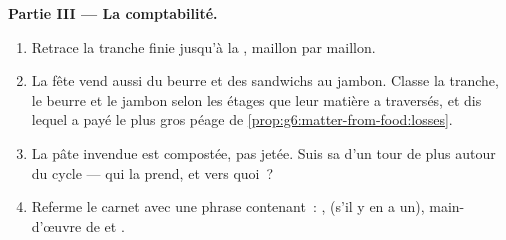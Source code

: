 \begin{problem}
\medskip\noindent\textbf{Partie III --- La comptabilité.}
\begin{enumerate}[resume]
  \item Retrace la tranche finie jusqu'à la , maillon par
        maillon.
  \item La fête vend aussi du beurre et des sandwichs au jambon.
        Classe la tranche, le beurre et le jambon selon les étages
        que leur matière a traversés, et dis lequel a payé le plus
        gros péage de
        \cref{prop:g6:matter-from-food:losses}.
  \item La pâte invendue est compostée, pas jetée. Suis sa  d'un tour de plus autour du cycle --- qui la
        prend, et vers quoi~?
  \item Referme le carnet avec une phrase contenant~: ,
         (s'il y en a un), main-d'œuvre de  et
        .
\end{enumerate}
\end{problem}
